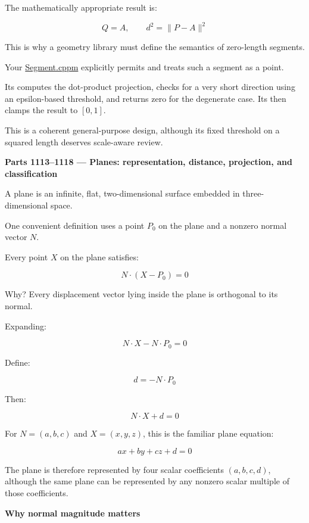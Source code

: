 The mathematically appropriate result is:

\[
Q=A,\qquad d^2=\|P-A\|^2
\]

This is why a geometry library must define the semantics of zero-length segments.

Your \href{https://github.com/swayam8624/KairoGeometry/blob/master/Segment.cppm?utm_source=chatgpt.com}{Segment.cppm} explicitly permits  and treats such a segment as a point.

Its  computes the dot-product projection, checks for a very short direction using an epsilon-based threshold, and returns zero for the degenerate case. Its  then clamps the result to \([0,1]\).

This is a coherent general-purpose design, although its fixed threshold on a squared length deserves scale-aware review.

\textbf{Parts 1113--1118 --- Planes: representation, distance, projection, and classification}

A plane is an infinite, flat, two-dimensional surface embedded in three-dimensional space.

One convenient definition uses a point \(P_0\) on the plane and a nonzero normal vector \(N\).

Every point \(X\) on the plane satisfies:

\[
\boxed{N\cdot(X-P_0)=0}
\]

Why? Every displacement vector lying inside the plane is orthogonal to its normal.

Expanding:

\[
N\cdot X-N\cdot P_0=0
\]

Define:

\[
d=-N\cdot P_0
\]

Then:

\[
\boxed{N\cdot X+d=0}
\]

For \(N=(a,b,c)\) and \(X=(x,y,z)\), this is the familiar plane equation:

\[
ax+by+cz+d=0
\]

The plane is therefore represented by four scalar coefficients \((a,b,c,d)\), although the same plane can be represented by any nonzero scalar multiple of those coefficients.

\textbf{Why normal magnitude matters}

